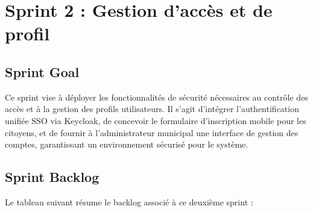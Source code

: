 \section{Sprint 2 : Gestion d'accès et de profil}

\subsection{Sprint Goal}
Ce sprint vise à déployer les fonctionnalités de sécurité nécessaires au contrôle des accès et à la gestion des profils utilisateurs. Il s'agit d'intégrer l'authentification unifiée SSO via Keycloak, de concevoir le formulaire d'inscription mobile pour les citoyens, et de fournir à l'administrateur municipal une interface de gestion des comptes, garantissant un environnement sécurisé pour le système.

\subsection{Sprint Backlog}
Le tableau suivant résume le backlog associé à ce deuxième sprint :

